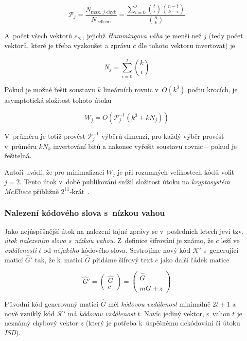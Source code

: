 \documentclass[thesis=M,czech,hidelinks]{FITthesis}[2012/06/26]
\newcommand{\0}{{\textcolor[gray]{0.80}{0}}}
\begin{document}
$$
    \mathcal{P}_j= \frac{N_{\text{max. $j$ chyb}}}{N_{\text{celkem}}}
    = \frac{\sum_{i=0}^{j}\binom{t}{i}\binom{n-t}{k-i}}{\binom{n}{k}}
$$

A~počet všech vektorů $e_\mathcal{K}$, jejichž \emph{Hammingova váha} je menší
než $j$ (tedy počet vektorů, které je třeba vyzkoušet a zprávu $c$ dle tohoto
vektoru invertovat) je

$$ N_j = \sum_{i=0}^{j}\binom{k}{i} $$

Pokud je možné řešit soustavu $k$ lineárních rovnic v~$O(k^3)$ počtu krocích, je
asymptotická složitost tohoto útoku

$$ W_j = O\left( \mathcal{P}_{j}^{-1}\left(k^3 + k N_j \right) \right) $$

V~průměru je totiž provést $\mathcal{P}_{j}^{-1}$ výběrů dimenzí, pro každý
výběr provést v~průměru $k N_k$ invertování bitů a nakonec vyřešit soustavu
rovnic -- pokud je řešitelná.

Autoři uvádí, že pro minimalizaci $W_j$ je při rozumných velikostech kódů volit
$j=2$. Tento útok v~době publikování snížil složitost útoku na
\emph{kryptosystém McEliece} přibližně $2^11$-krát~\cite{Lee}.

\subsubsection{Nalezení kódového slova s~nízkou vahou}

Jako nejúspěšnější útok na nalezení tajné zprávy se v~posledních letech jeví
tzv. \emph{útok nalezením slova s~nízkou vahou}. Z~definice šifrování je známo,
že $c$ leží ve \emph{vzdálenosti} $t$ od \emph{nějakého} kódového slova.
Sestrojíme nový kód $\mathcal{K}'$ s~generující maticí $\hat{G}'$ tak, že
k~matici $\hat{G}$ přidáme šifrový text $c$ jako další řádek matice

$$
    \hat{G}' = \left(\begin{array}{c}
        \hat{G} \\
        c
    \end{array}\right) = \left(\begin{array}{c}
        \hat{G} \\
        m\hat{G} + z
    \end{array}\right)
$$

Původní kód generovaný maticí $\hat{G}$ měl \emph{kódovou vzdálenost} minimálně
$2t+1$ a nově vzniklý kód $\mathcal{K}'$ má \emph{kódovou vzdálenost} $t$. Navíc
jediný vektor, s~vahou $t$ je neznámý chybový vektor $z$ (který je potřeba
k~úspěšnému dekódování či útoku \emph{ISD}).
\end{document}
